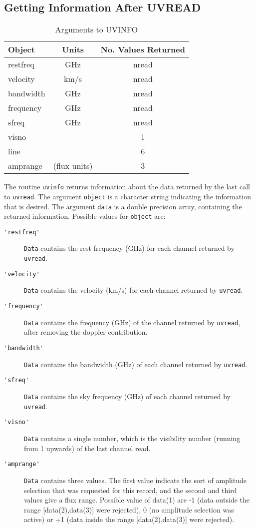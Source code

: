 \subsection{Getting Information After UVREAD}
\begin{table}\centering
\begin{tabular}{|l|c|c|}				    \hline
\bf Object	& \bf Units	& \bf No. Values Returned\\ \hline
restfreq	& GHz		& nread \\
velocity	& km/s		& nread \\
bandwidth	& GHz		& nread \\
frequency	& GHz		& nread \\
sfreq		& GHz		& nread \\
visno		&		& 1\\
line		&		& 6\\
amprange	& (flux units)	& 3\\			    \hline
\end{tabular}
\caption{Arguments to UVINFO}
\label{t:uvinfo}
\end{table}
The routine {\tt uvinfo} returns information about the data returned by
the last call to {\tt uvread}. The argument {\tt object} is a character
string indicating the information that is desired. The argument {\tt data}
is a double precision array, containing the returned information.
Possible values for {\tt object} are:
\begin{description}
\item[\verb+'restfreq'+] {\tt Data} contains the rest frequency (GHz) for
each channel returned by {\tt uvread}.
\item[\verb+'velocity'+] {\tt Data} contains the velocity (km/s) for each
channel returned by {\tt uvread}.
\item[\verb+'frequency'+] {\tt Data} contains the frequency (GHz) of the
channel returned by {\tt uvread}, after removing the doppler contribution.
\item[\verb+'bandwidth'+] {\tt Data} contains the bandwidth (GHz) of each
channel returned by {\tt uvread}.
\item[\verb+'sfreq'+] {\tt Data} contains the sky frequency (GHz) of each
channel returned by {\tt uvread}.
\item[\verb+'visno'+] {\tt Data} contains a single number, which is the
visibility number (running from 1 upwards) of the last channel read.
\item[\verb+'amprange'+] {\tt Data} contains three values. The first value
indicate the sort of amplitude selection that was requested for this
record, and the second and third values give a flux range.
Possible value of data(1) are -1 (data outside the range [data(2),data(3)]
were rejected), 0 (no amplitude selection was active) or +1 (data inside the
range [data(2),data(3)] were rejected).
\end{description}
